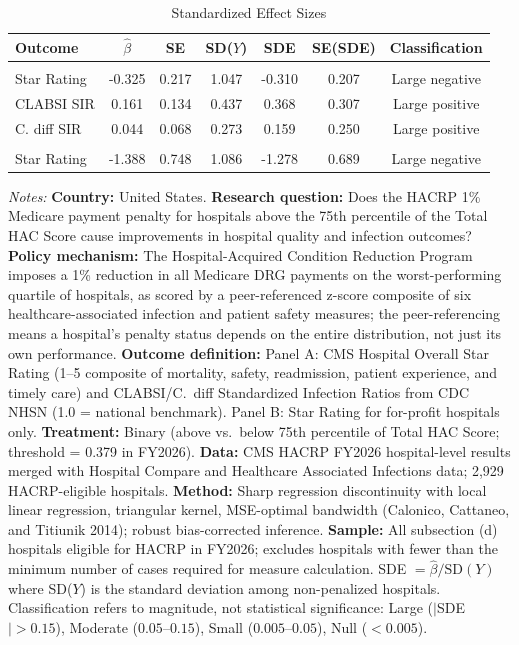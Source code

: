 \begin{table}[t]
\centering
\caption{Standardized Effect Sizes}
\label{tab:sde}
\begin{threeparttable}
\begin{tabular}{lcccccc}
\toprule
Outcome & $\hat{\beta}$ & SE & SD($Y$) & SDE & SE(SDE) & Classification \\
\midrule
\addlinespace[3pt]
\multicolumn{7}{l}{\textit{Panel A: Pooled}} \\
\addlinespace[2pt]
Star Rating & -0.325 & 0.217 & 1.047 & -0.310 & 0.207 & Large negative \\
CLABSI SIR & 0.161 & 0.134 & 0.437 & 0.368 & 0.307 & Large positive \\
C. diff SIR & 0.044 & 0.068 & 0.273 & 0.159 & 0.250 & Large positive \\
\addlinespace[3pt]
\multicolumn{7}{l}{\textit{Panel B: Heterogeneous (For-Profit Hospitals)}} \\
\addlinespace[2pt]
Star Rating & -1.388 & 0.748 & 1.086 & -1.278 & 0.689 & Large negative \\
\bottomrule
\end{tabular}
\begin{tablenotes}
\footnotesize
\item \textit{Notes:} \textbf{Country:} United States. \textbf{Research question:} Does the HACRP 1\% Medicare payment penalty for hospitals above the 75th percentile of the Total HAC Score cause improvements in hospital quality and infection outcomes? \textbf{Policy mechanism:} The Hospital-Acquired Condition Reduction Program imposes a 1\% reduction in all Medicare DRG payments on the worst-performing quartile of hospitals, as scored by a peer-referenced z-score composite of six healthcare-associated infection and patient safety measures; the peer-referencing means a hospital's penalty status depends on the entire distribution, not just its own performance. \textbf{Outcome definition:} Panel A: CMS Hospital Overall Star Rating (1--5 composite of mortality, safety, readmission, patient experience, and timely care) and CLABSI/C.~diff Standardized Infection Ratios from CDC NHSN (1.0 = national benchmark). Panel B: Star Rating for for-profit hospitals only. \textbf{Treatment:} Binary (above vs.\ below 75th percentile of Total HAC Score; threshold = 0.379 in FY2026). \textbf{Data:} CMS HACRP FY2026 hospital-level results merged with Hospital Compare and Healthcare Associated Infections data; 2,929 HACRP-eligible hospitals. \textbf{Method:} Sharp regression discontinuity with local linear regression, triangular kernel, MSE-optimal bandwidth (Calonico, Cattaneo, and Titiunik 2014); robust bias-corrected inference. \textbf{Sample:} All subsection (d) hospitals eligible for HACRP in FY2026; excludes hospitals with fewer than the minimum number of cases required for measure calculation. SDE $= \hat{\beta} / \text{SD}(Y)$ where SD($Y$) is the standard deviation among non-penalized hospitals. Classification refers to magnitude, not statistical significance: Large ($|$SDE$| > 0.15$), Moderate ($0.05$--$0.15$), Small ($0.005$--$0.05$), Null ($< 0.005$).
\end{tablenotes}
\end{threeparttable}
\end{table}
